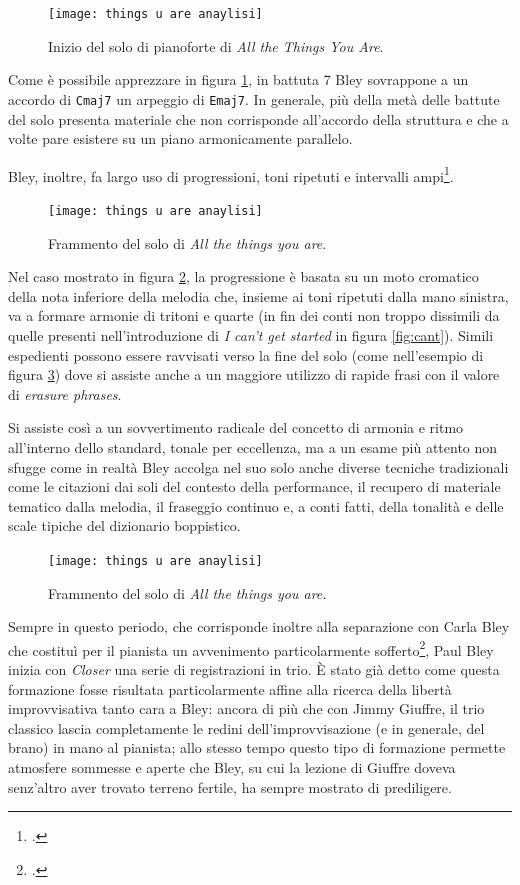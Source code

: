  \begin{figure}[H]
 	\centering
 	\texttt{[image: things u are anaylisi]}
 	\caption{Inizio del solo di pianoforte di \textit{All the Things You Are}.}
 	\label{fig:screenshot002}
 \end{figure}
 Come è possibile apprezzare in figura \ref{fig:screenshot002}, in battuta 7 Bley sovrappone a un accordo di \verb*|Cmaj7| un arpeggio di \verb*|Emaj7|. In generale, più della metà delle battute del solo presenta materiale che non corrisponde all'accordo della struttura e che a volte pare esistere su un piano armonicamente parallelo.\par
 Bley, inoltre, fa largo uso di progressioni, toni ripetuti e intervalli ampi\footcite[108]{dean}.
 \begin{figure}[h]
 	\centering
 	\texttt{[image: things u are anaylisi]}
 	\caption{Frammento del solo di \textit{All the things you are}.}
 	\label{fig:screenshot003}
 \end{figure}
 Nel caso mostrato in figura \ref{fig:screenshot003}, la progressione è basata su un moto cromatico della nota inferiore della melodia che, insieme ai toni ripetuti dalla mano sinistra, va a formare armonie di tritoni e quarte (in fin dei conti non troppo dissimili da quelle presenti nell'introduzione di \textit{I can't get started} in figura \ref{fig:cant}). Simili espedienti possono essere ravvisati verso la fine del solo (come nell'esempio di figura \ref{fig:screenshot004}) dove si assiste anche a un maggiore utilizzo di rapide frasi con il valore di \textit{erasure phrases}.\par
 Si assiste così a un sovvertimento radicale del concetto di armonia e ritmo all'interno dello standard, tonale per eccellenza, ma a un esame più attento non sfugge come in realtà Bley accolga nel suo solo anche diverse tecniche tradizionali come le citazioni dai soli del contesto della performance, il recupero di materiale tematico dalla melodia, il fraseggio continuo e, a conti fatti, della tonalità e delle scale tipiche del dizionario boppistico.
 \begin{figure}[H]
 	\centering
 	\texttt{[image: things u are anaylisi]}
 	\caption{Frammento del solo di \textit{All the things you are.}}
 	\label{fig:screenshot004}
 \end{figure}
Sempre in questo periodo, che corrisponde inoltre alla separazione con Carla Bley che costituì per il pianista un avvenimento particolarmente sofferto\footcite[68]{cappelletti}, Paul Bley inizia con \textit{Closer} una serie di registrazioni in trio. È stato già detto come questa formazione fosse risultata particolarmente affine alla ricerca della libertà improvvisativa tanto cara a Bley: ancora di più che con Jimmy Giuffre, il trio classico lascia completamente le redini dell'improvvisazione (e in generale, del brano) in mano al pianista; allo stesso tempo questo tipo di formazione permette atmosfere sommesse e aperte che Bley, su cui la lezione di Giuffre doveva senz'altro aver trovato terreno fertile, ha sempre mostrato di prediligere. \\

